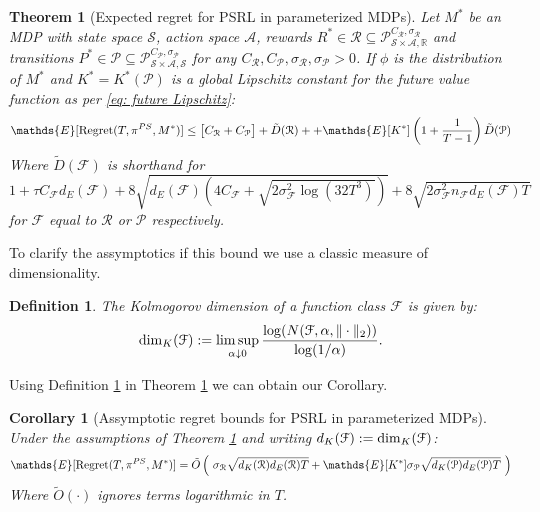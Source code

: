 \documentclass{article}
\newtheorem{theorem}{Theorem}
\newtheorem{corollary}{Corollary}
\newtheorem{mydef}{Definition}
\newcommand{\Exp}{\mathds{E}}
\newcommand{\Real}{\mathds{R}}
\newcommand{\Pc}{\mathcal{P}}
\newcommand{\Fc}{\mathcal{F}}
\newcommand{\Rc}{\mathcal{R}}
\newcommand{\Sc}{\mathcal{S}}
\newcommand{\Ac}{\mathcal{A}}
\begin{document}
\begin{theorem}[Expected regret for PSRL in parameterized MDPs]
\label{thm: main regret} \hspace{0.00000000000001mm} \newline
Let $M^*$ be an MDP with state space $\Sc$, action space $\Ac$, rewards $R^* \in \Rc \subseteq \Pc^{C_\Rc,\sigma_\Rc}_{\Sc \times \Ac,\Real}$ and transitions $P^* \in \Pc \subseteq \Pc^{C_\Pc,\sigma_\Pc}_{\Sc \times \Ac,\Sc}$ for any $C_\Rc, C_\Pc, \sigma_\Rc, \sigma_\Pc >0 $.
If $\phi$ is the distribution of $M^*$ and $K^* = K^*(\Pc)$ is a global Lipschitz constant for the future value function as per \eqref{eq: future Lipschitz}:
\begin{eqnarray}
\label{eq: reg proof}
    \Exp[{\rm Regret}(T,\pi^{PS},M^*)] \le \big[ C_\Rc + C_\Pc \big] + \tilde{D}(\Rc)
    + + \Exp[K^*]\left(1+\frac{1}{T-1}\right) \tilde{D}(\Pc)
\end{eqnarray}
Where $\tilde{D}(\Fc)$ is shorthand for $ 1 + \tau C_\Fc d_E(\Fc) + 8\sqrt{d_E(\Fc)(4C_\Fc + \sqrt{2\sigma_\Fc^2 \log(32T^3)})} + 8\sqrt{2 \sigma_\Fc^2 n_\Fc d_E(\Fc) T}$ for $\Fc$ equal to $\Rc$ or $\Pc$ respectively.
\end{theorem}

To clarify the assymptotics if this bound we use a classic measure of dimensionality.
\begin{mydef}
\label{def: kol}
The Kolmogorov dimension of a function class $\Fc$ is given by:
$$ {\rm dim}_K(\Fc) := \limsup_{\alpha \downarrow 0} \frac{\log(N(\Fc,\alpha,\|\cdot\|_2))}{\log(1/\alpha)} .$$
\end{mydef}
Using Definition \ref{def: kol} in Theorem \ref{thm: main regret} we can obtain our Corollary.
\begin{corollary}[Assymptotic regret bounds for PSRL in parameterized MDPs]
\label{cor: ass regret} \hspace{0.00000000000001mm} \newline
Under the assumptions of Theorem \ref{thm: main regret} and writing $d_K(\Fc) := {\rm dim}_K(\Fc)$:
\begin{equation}
	\Exp[{\rm Regret}(T,\pi^{PS},M^*)] = \tilde{O} \left( \ \sigma_\Rc \sqrt{d_K(\Rc) d_E(\Rc) T}
		+ \Exp[K^*] \sigma_\Pc \sqrt{d_K(\Pc) d_E(\Pc) T} \ \right)
\end{equation}
Where $\tilde{O}(\cdot)$ ignores terms logarithmic in $T$.
\end{corollary}
\end{document}
